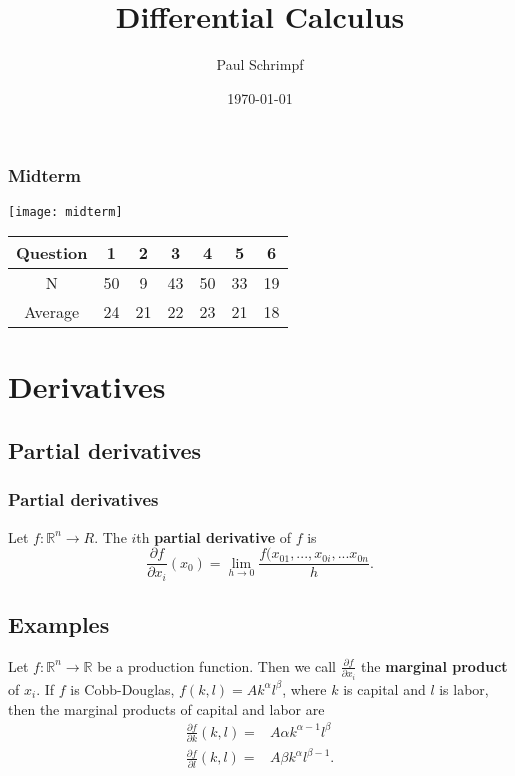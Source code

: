 \documentclass[compress]{beamer}
\title{Differential Calculus}
\author{Paul Schrimpf}
\institute{UBC \\ Economics 526}
\date{\today}
\def\R{\mathbb{R}}
\renewcommand{\to}{{\rightarrow}}
\begin{document}
\frame{\titlepage}

\begin{frame}
  \frametitle{Midterm}
  \texttt{[image: midterm]} \\

  \begin{tabular}{c|ccc|ccc}
    Question & 1 & 2 & 3 & 4 & 5 & 6 \\ \hline
    N & 50 & 9 & 43  & 50 & 33 & 19\\
    Average & 24 & 21 & 22 & 23 &  21 & 18 \\  \hline
  \end{tabular}
\end{frame}

\begin{frame}
  \tableofcontents  
\end{frame}

\section{Derivatives}

\subsection{Partial derivatives}
\begin{frame}
  \frametitle{Partial derivatives}
  \begin{definition}
    Let $f:\R^n \to R$. The $i$th \textbf{partial derivative} of $f$ is 
    \[ \frac{\partial f}{\partial x_i} (x_0) = \lim_{h \to 0}
    \frac{f(x_{01},...,x_{0i}, ... x_{0n}}{h}. \]
  \end{definition}
\end{frame}
\subsection{Examples}
\begin{frame}
\begin{example}
  Let $f:\R^n \to \R$ be a production function. Then we call
  $\frac{\partial f}{\partial x_i}$ the \textbf{marginal product} of
  $x_i$. If $f$ is Cobb-Douglas, $f(k,l) = Ak^\alpha l^\beta$, where
  $k$ is capital and $l$ is labor, then the marginal products of
  capital and labor are
  \begin{align*}
    \frac{\partial f}{\partial k} (k,l) = & A \alpha k^{\alpha-1}
    l^\beta \\
    \frac{\partial f}{\partial l} (k,l) = & A \beta k^{\alpha}
    l^{\beta -1}.
  \end{align*}
\end{example}
\end{frame}
\end{document}

